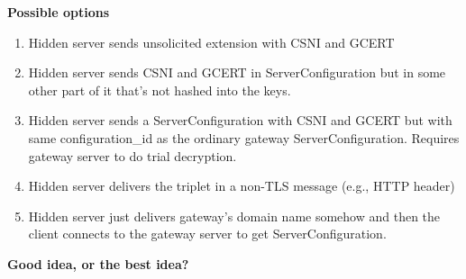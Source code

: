 \documentclass[helvetica]{seminar}
\newcommand{\heading}[1]{%
  \begin{center} 
    \large\bf 
    #1 
  \end{center} 
  \vspace{.4 in}}
\begin{document}
\begin{slide}
\heading{Possible options}

\vspace{-5ex}
\begin{enumerate}
\item Hidden server sends unsolicited extension with CSNI and GCERT
\item Hidden server sends CSNI and GCERT in ServerConfiguration but in some other part of it that's not hashed into the keys.
\item Hidden server sends a ServerConfiguration with CSNI and GCERT but with same configuration\_id as the ordinary gateway ServerConfiguration. Requires gateway server to do trial decryption.
\item Hidden server delivers the triplet in a non-TLS message (e.g., HTTP header)
\item Hidden server just delivers gateway's domain name somehow and then the
  client connects to the gateway server to get ServerConfiguration.
\end{enumerate}
\end{slide}

\begin{slide}
\vspace{1in}
\heading{Good idea, or the best idea?}

\end{slide}
\end{document}
